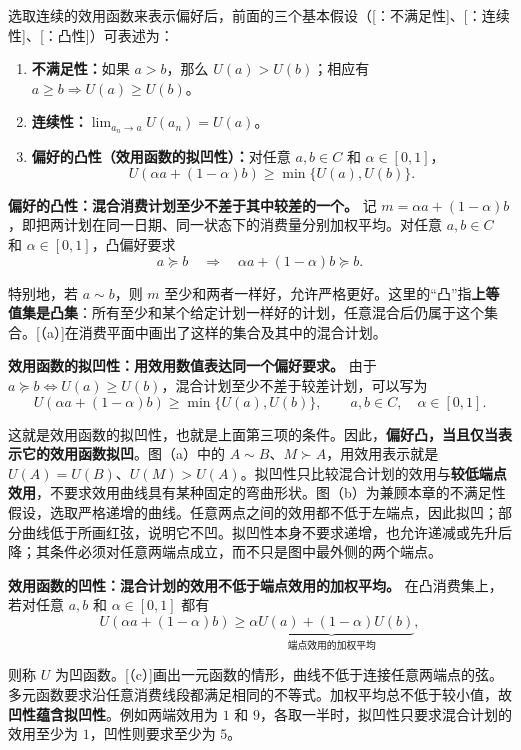 \begin{tcolorbox}[knowledge,title=偏好假设的效用函数表示]
选取连续的效用函数来表示偏好后，前面的三个基本假设（[：不满足性]、[：连续性]、[：凸性]）可表述为：
\begin{enumerate}
    \item \textbf{不满足性：}如果 $a>b$，那么 $U(a)>U(b)$；相应有 $a\ge b\Rightarrow U(a)\ge U(b)$。
    \item \textbf{连续性：}$\lim_{a_n \to a}U(a_n)=U(a)$。
    \item \textbf{偏好的凸性（效用函数的拟凹性）：}对任意 $a,b\in C$ 和 $\alpha\in[0,1]$，
    \[
      U(\alpha a+(1-\alpha)b)\ge\min\{U(a),U(b)\}.
    \]
\end{enumerate}
\tcbline
\textbf{偏好的凸性：混合消费计划至少不差于其中较差的一个。}
记 $m=\alpha a+(1-\alpha)b$，即把两计划在同一日期、同一状态下的消费量分别加权平均。对任意 $a,b\in C$ 和 $\alpha\in[0,1]$，凸偏好要求
\[
 a\succeq b\quad\Longrightarrow\quad
 \alpha a+(1-\alpha)b\succeq b.
\]

特别地，若 $a\sim b$，则 $m$ 至少和两者一样好，允许严格更好。这里的“凸”指\textbf{上等值集是凸集}：所有至少和某个给定计划一样好的计划，任意混合后仍属于这个集合。[（a）]在消费平面中画出了这样的集合及其中的混合计划。

\textbf{效用函数的拟凹性：用效用数值表达同一个偏好要求。}
由于 $a\succeq b\iff U(a)\ge U(b)$，混合计划至少不差于较差计划，可以写为
\[
 U(\alpha a+(1-\alpha)b)\ge\min\{U(a),U(b)\},
 \qquad a,b\in C,\quad\alpha\in[0,1].
\]

这就是效用函数的拟凹性，也就是上面第三项的条件。因此，\textbf{偏好凸，当且仅当表示它的效用函数拟凹}。图（a）中的 $A\sim B$、$M\succ A$，用效用表示就是 $U(A)=U(B)$、$U(M)>U(A)$。拟凹性只比较混合计划的效用与\textbf{较低端点效用}，不要求效用曲线具有某种固定的弯曲形状。图（b）为兼顾本章的不满足性假设，选取严格递增的曲线。任意两点之间的效用都不低于左端点，因此拟凹；部分曲线低于所画红弦，说明它不凹。拟凹性本身不要求递增，也允许递减或先升后降；其条件必须对任意两端点成立，而不只是图中最外侧的两个端点。

\textbf{效用函数的凹性：混合计划的效用不低于端点效用的加权平均。}
在凸消费集上，若对任意 $a,b$ 和 $\alpha\in[0,1]$ 都有
\[
 U(\alpha a+(1-\alpha)b)\ge\underbrace{\alpha U(a)+(1-\alpha)U(b)}_{\text{端点效用的加权平均}},
\]

则称 $U$ 为凹函数。[（c）]画出一元函数的情形，曲线不低于连接任意两端点的弦。多元函数要求沿任意消费线段都满足相同的不等式。加权平均总不低于较小值，故\textbf{凹性蕴含拟凹性}。例如两端效用为 $1$ 和 $9$，各取一半时，拟凹性只要求混合计划的效用至少为 $1$，凹性则要求至少为 $5$。
\end{tcolorbox}


